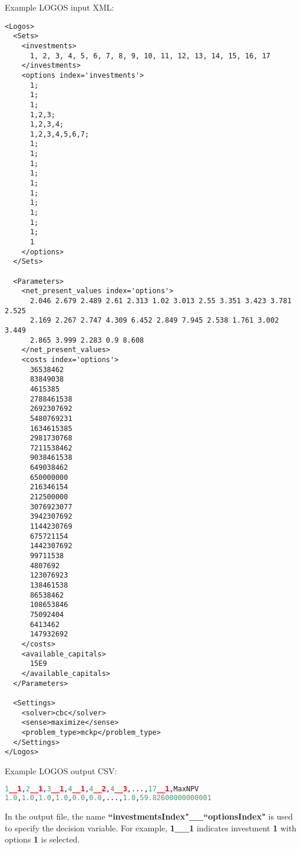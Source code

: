 Example LOGOS input XML:
\begin{lstlisting}[style=XML]
<Logos>
  <Sets>
    <investments>
      1, 2, 3, 4, 5, 6, 7, 8, 9, 10, 11, 12, 13, 14, 15, 16, 17
    </investments>
    <options index='investments'>
      1;
      1;
      1;
      1,2,3;
      1,2,3,4;
      1,2,3,4,5,6,7;
      1;
      1;
      1;
      1;
      1;
      1;
      1;
      1;
      1;
      1;
      1
    </options>
  </Sets>

  <Parameters>
    <net_present_values index='options'>
      2.046 2.679 2.489 2.61 2.313 1.02 3.013 2.55 3.351 3.423 3.781 2.525
      2.169 2.267 2.747 4.309 6.452 2.849 7.945 2.538 1.761 3.002 3.449
      2.865 3.999 2.283 0.9 8.608
    </net_present_values>
    <costs index='options'>
      36538462
      83849038
      4615385
      2788461538
      2692307692
      5480769231
      1634615385
      2981730768
      7211538462
      9038461538
      649038462
      650000000
      216346154
      212500000
      3076923077
      3942307692
      1144230769
      675721154
      1442307692
      99711538
      4807692
      123076923
      138461538
      86538462
      108653846
      75092404
      6413462
      147932692
    </costs>
    <available_capitals>
      15E9
    </available_capitals>
  </Parameters>

  <Settings>
    <solver>cbc</solver>
    <sense>maximize</sense>
    <problem_type>mckp</problem_type>
  </Settings>
</Logos>
\end{lstlisting}

Example LOGOS output CSV:
\begin{lstlisting}[language=python]
1__1,2__1,3__1,4__1,4__2,4__3,...,17__1,MaxNPV
1.0,1.0,1.0,1.0,0.0,0.0,...,1.0,59.82600000000001
\end{lstlisting}

In the output file, the name \textbf{``investmentsIndex"\_\_``optionsIndex"} is used to
specify the decision variable. For example, \textbf{1\_\_1} indicates investment \textbf{1}
with options \textbf{1} is selected.
